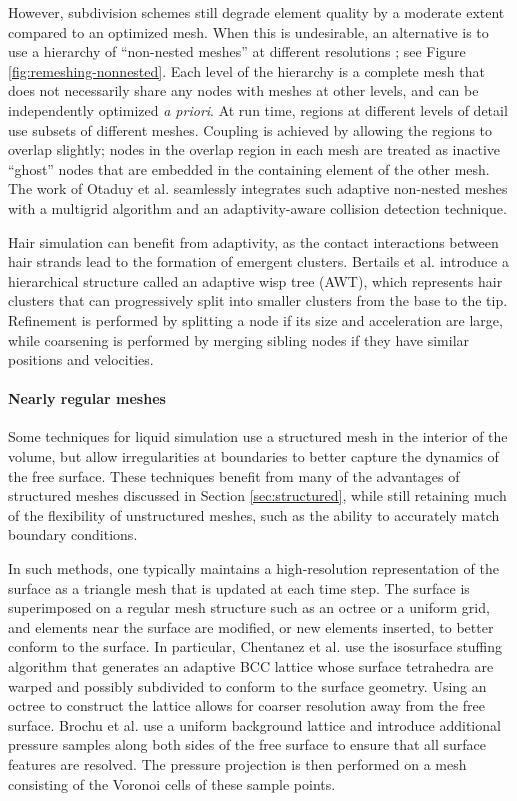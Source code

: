 However, subdivision schemes still degrade element quality by a moderate extent compared to an optimized mesh.
When this is undesirable, an alternative is to use a hierarchy of ``non-nested meshes'' at different resolutions \cite{Debunne2000,Debunne2001}; see Figure \ref{fig:remeshing-nonnested}.
Each level of the hierarchy is a complete mesh that does not necessarily share any nodes with meshes at other levels, and can be independently optimized \textit{a priori}.
At run time, regions at different levels of detail use subsets of different meshes.
Coupling is achieved by allowing the regions to overlap slightly; nodes in the overlap region in each mesh are treated as inactive ``ghost'' nodes that are embedded in the containing element of the other mesh.
The work of Otaduy et al. \cite{Otaduy2007} seamlessly integrates such adaptive non-nested meshes with a multigrid algorithm and an adaptivity-aware collision detection technique.

Hair simulation can benefit from adaptivity, as the contact interactions between hair strands lead to the formation of emergent clusters.
Bertails et al. \cite{Bertails2003} introduce a hierarchical structure called an adaptive wisp tree (AWT), which represents hair clusters that can progressively split into smaller clusters from the base to the tip.
Refinement is performed by splitting a node if its size and acceleration are large, while coarsening is performed by merging sibling nodes if they have similar positions and velocities.

\paragraph*{Nearly regular meshes}
Some techniques for liquid simulation use a structured mesh in the interior of the volume, but allow irregularities at boundaries to better capture the dynamics of the free surface.
These techniques benefit from many of the advantages of structured meshes discussed in Section \ref{sec:structured}, while still retaining much of the flexibility of unstructured meshes, such as the ability to accurately match boundary conditions.

In such methods, one typically maintains a high-resolution representation of the surface as a triangle mesh that is updated at each time step.
The surface is superimposed on a regular mesh structure such as an octree or a uniform grid, and elements near the surface are modified, or new elements inserted, to better conform to the surface.
In particular, Chentanez et al. \cite{Chentanez2007} use the isosurface stuffing algorithm \cite{Labelle2007} that generates an adaptive BCC lattice whose surface tetrahedra are warped and possibly subdivided to conform to the surface geometry.
Using an octree to construct the lattice allows for coarser resolution away from the free surface.
Brochu et al. \cite{Brochu2010} use a uniform background lattice and introduce additional pressure samples along both sides of the free surface to ensure that all surface features are resolved.
The pressure projection is then performed on a mesh consisting of the Voronoi cells of these sample points.

